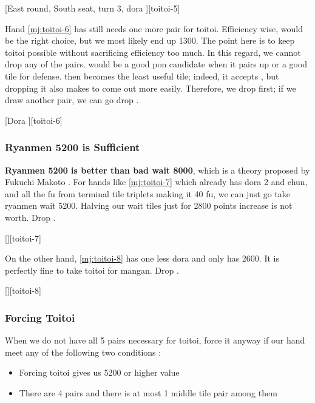 \documentclass[12pt]{article}
\begin{document}
[East round, South seat, turn 3, dora ][toitoi-5]

Hand \ref{mj:toitoi-6} has still needs one more pair for toitoi. Efficiency wise,  would be the right choice, but we most likely end up 1300. The point here is to keep toitoi possible without sacrificing efficiency too much. In this regard, we cannot drop any of the pairs.  would be a good pon candidate when it pairs up or a good tile for defense.  then becomes the least useful tile; indeed, it accepts , but dropping it also makes  to come out more easily. Therefore, we drop  first; if we draw another pair, we can go drop  \citep[][p.~58]{zero-teyaku}.

[Dora ][toitoi-6]


\subsubsection*{Ryanmen 5200 is Sufficient}

\textbf{Ryanmen 5200 is better than bad wait 8000}, which is a theory proposed by Fukuchi Makoto \citep{yoteru-toitoi}. For hands like \ref{mj:toitoi-7} which already has dora 2 and chun, and all the fu from terminal tile triplets making it 40 fu, we can just go take ryanmen wait 5200. Halving our wait tiles just for 2800 points increase is not worth. Drop .

[][toitoi-7]

On the other hand, \ref{mj:toitoi-8} has one less dora and only has 2600. It is perfectly fine to take toitoi for mangan. Drop .

[][toitoi-8]


\subsubsection*{Forcing Toitoi}

When we do not have all 5 pairs necessary for toitoi, force it anyway if our hand meet any of the following two conditions \citep[][p.~59]{zero-teyaku}:

\begin{itemize}
\item Forcing toitoi gives us 5200 or higher value
\item There are 4 pairs and there is at most 1 middle tile pair among them
\end{itemize}
\end{document}
